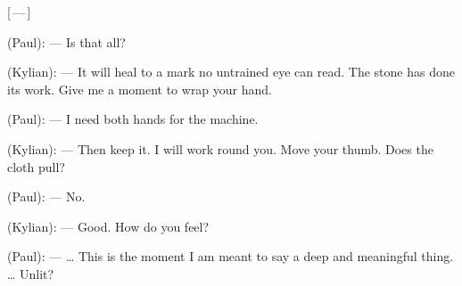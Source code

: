 \begin{room}
\centerline{[\,---\,]}

(Paul): --- Is that all?

(Kylian): --- It will heal to a mark no untrained eye can read. The stone has done its work. Give me a moment to wrap your hand.

(Paul): --- I need both hands for the machine.

(Kylian): --- Then keep it. I will work round you. Move your thumb. Does the cloth pull?

(Paul): --- No.

(Kylian): --- Good. How do you feel?

(Paul): --- \ldots{} This is the moment I am meant to say a deep and meaningful thing. \ldots{} Unlit?

\end{room}
